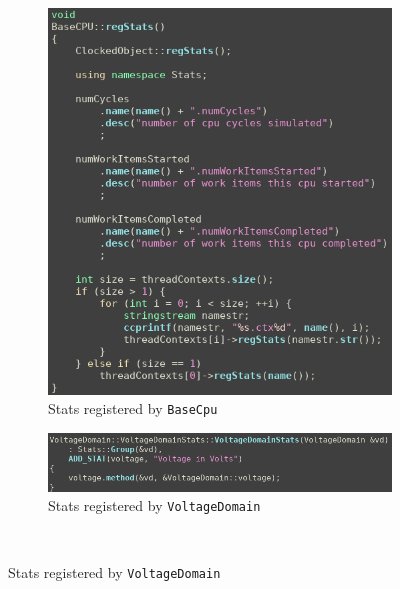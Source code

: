     \begin{figure}[H]
        \centering
        \begin{subfigure}[b]{0.45\textwidth}
            \centering
            \includegraphics[width=\textwidth]{screenshots/have-to-search-src-for-regStats/base-cpu-cc-regStats.png}
            \caption{Stats registered by \texttt{BaseCpu}}
        \end{subfigure}
        \hfil
        \begin{minipage}[b]{0.45\textwidth}
            \begin{subfigure}[b]{\linewidth}
                \centering
                \includegraphics[width=\textwidth]{screenshots/have-to-search-src-for-regStats/voltage-domain-registers-a-stat.png}
                \caption{Stats registered by \texttt{VoltageDomain}}
            \end{subfigure}
            \\[\baselineskip]

\end{minipage}
\end{figure}
